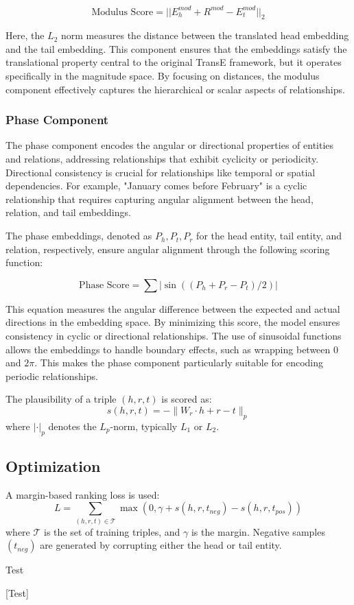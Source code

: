 \documentclass[11pt]{article}
\begin{document}
{\[
\text{Modulus Score} = ||E_h^{mod} + R^{mod} - E_t^{mod}||_2
\]

Here, the \( L_2 \) norm measures the distance between the translated head embedding and the tail embedding. This component ensures that the embeddings satisfy the translational property central to the original TransE framework, but it operates specifically in the magnitude space. By focusing on distances, the modulus component effectively captures the hierarchical or scalar aspects of relationships.

\subsubsection{Phase Component}

The phase component encodes the angular or directional properties of entities and relations, addressing relationships that exhibit cyclicity or periodicity. Directional consistency is crucial for relationships like temporal or spatial dependencies. For example, "January comes before February" is a cyclic relationship that requires capturing angular alignment between the head, relation, and tail embeddings.

The phase embeddings, denoted as \( P_h, P_t, P_r \) for the head entity, tail entity, and relation, respectively, ensure angular alignment through the following scoring function:

\[
\text{Phase Score} = \sum |\sin((P_h + P_r - P_t)/2)|
\]

This equation measures the angular difference between the expected and actual directions in the embedding space. By minimizing this score, the model ensures consistency in cyclic or directional relationships. The use of sinusoidal functions allows the embeddings to handle boundary effects, such as wrapping between \( 0 \) and \( 2\pi \). This makes the phase component particularly suitable for encoding periodic relationships.


The plausibility of a triple $(h, r, t)$ is scored as:
\begin{equation}
s(h, r, t) = -\| W_r \cdot h + r - t \|_p
\end{equation}
where $|\cdot|_p$ denotes the $L_p$-norm, typically $L_1$ or $L_2$.

\subsection{Optimization}
A margin-based ranking loss is used:
\begin{equation}
L = \sum_{(h,r,t) \in \mathcal{T}} \max(0, \gamma + s(h, r, t_{neg}) - s(h, r, t_{pos}))
\end{equation}
where $\mathcal{T}$ is the set of training triples, and $\gamma$ is the margin. Negative samples $(t_{neg})$ are generated by corrupting either the head or tail entity.
\item[Test]
\item{}[Test]
}
\end{document}
